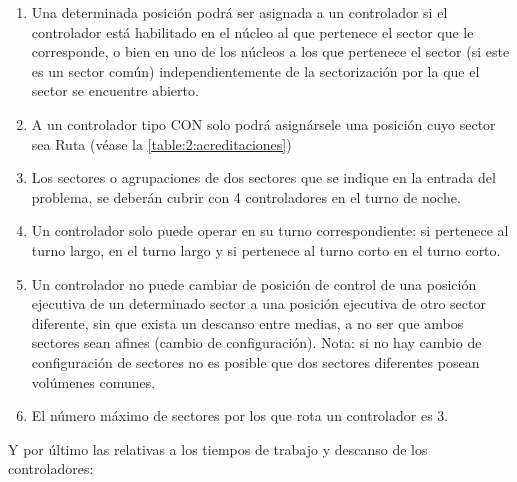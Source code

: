 \begin{enumerate}[resume*]
	\item \label{RD:acreditacion-valida} Una determinada posición podrá ser asignada a un controlador si el controlador está habilitado en el núcleo al que pertenece el sector que le corresponde, o bien en uno de los núcleos a los que pertenece el sector
	(si este es un sector común) independientemente de la sectorización por la que el sector se encuentre abierto.
	
	\item A un controlador tipo CON solo podrá asignársele una posición cuyo sector sea Ruta (véase la \autoref{table:2:acreditaciones})
	
	\item Los sectores o agrupaciones de dos sectores que se indique en la entrada del problema, se deberán cubrir con 4 controladores en el turno	de noche.

	\item Un controlador solo puede operar en su turno correspondiente: si pertenece al turno largo, en el turno largo y si pertenece al turno corto en el turno corto.

	\item Un controlador no puede cambiar de posición de control de una posición ejecutiva de un determinado sector a una posición ejecutiva de otro sector diferente, sin que exista un descanso entre medias, a no ser que ambos sectores sean afines (cambio de configuración). Nota: si no hay cambio de configuración de sectores no es posible que dos sectores diferentes posean volúmenes comunes.
	
	\item El número máximo de sectores por los que rota un controlador es 3.
	
	
	
	
\end{enumerate}



Y por último las relativas a los tiempos de trabajo y descanso de los controladores:

